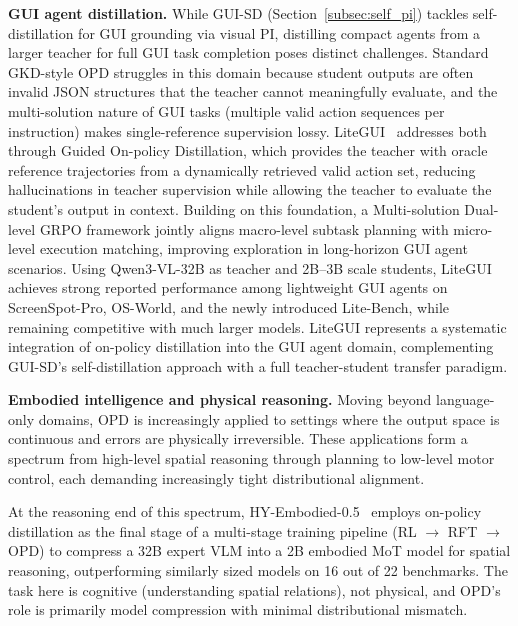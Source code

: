 \documentclass{article} %
\begin{document}
\textbf{GUI agent distillation.} While GUI-SD (Section~\ref{subsec:self_pi}) tackles self-distillation for GUI grounding via visual PI, distilling compact agents from a larger teacher for full GUI task completion poses distinct challenges. Standard GKD-style OPD struggles in this domain because student outputs are often invalid JSON structures that the teacher cannot meaningfully evaluate, and the multi-solution nature of GUI tasks (multiple valid action sequences per instruction) makes single-reference supervision lossy. LiteGUI~\citep{2605.07505} addresses both through Guided On-policy Distillation, which provides the teacher with oracle reference trajectories from a dynamically retrieved valid action set, reducing hallucinations in teacher supervision while allowing the teacher to evaluate the student's output in context. Building on this foundation, a Multi-solution Dual-level GRPO framework jointly aligns macro-level subtask planning with micro-level execution matching, improving exploration in long-horizon GUI agent scenarios. Using Qwen3-VL-32B as teacher and 2B--3B scale students, LiteGUI achieves strong reported performance among lightweight GUI agents on ScreenSpot-Pro, OS-World, and the newly introduced Lite-Bench, while remaining competitive with much larger models. LiteGUI represents a systematic integration of on-policy distillation into the GUI agent domain, complementing GUI-SD's self-distillation approach with a full teacher-student transfer paradigm.

\textbf{Embodied intelligence and physical reasoning.} Moving beyond language-only domains, OPD is increasingly applied to settings where the output space is continuous and errors are physically irreversible. These applications form a spectrum from high-level spatial reasoning through planning to low-level motor control, each demanding increasingly tight distributional alignment.

At the reasoning end of this spectrum, HY-Embodied-0.5~\citep{2604.07430} employs on-policy distillation as the final stage of a multi-stage training pipeline (RL $\to$ RFT $\to$ OPD) to compress a 32B expert VLM into a 2B embodied MoT model for spatial reasoning, outperforming similarly sized models on 16 out of 22 benchmarks. The task here is cognitive (understanding spatial relations), not physical, and OPD's role is primarily model compression with minimal distributional mismatch.
\end{document}
